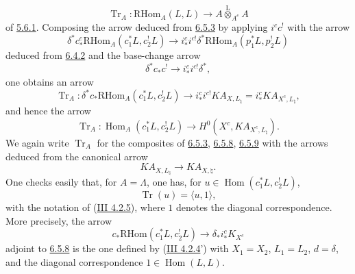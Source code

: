 \documentclass[11pt]{article}
\DeclareMathOperator{\Hom}{Hom}
\providecommand{\RHom}{\mathrm{RHom}}
\providecommand{\Tr}{\operatorname{Tr}}
\providecommand{\Tr}{\operatorname{Tr}}
\providecommand{\lten}{\overset{\mathrm L}{\otimes}}
\providecommand{\Tr}{\operatorname{Tr}}
\providecommand{\RHom}{\mathrm{RHom}}
\providecommand{\Hom}{\operatorname{Hom}}
\providecommand{\lten}{\overset{\mathrm L}{\otimes}}
\providecommand{\RHom}{\mathrm R\mathcal{H}om}
\providecommand{\lten}{\overset{\mathrm L}{\otimes}}
\providecommand{\Tr}{\operatorname{Tr}}
\providecommand{\lten}{\overset{\mathrm L}{\otimes}}
\providecommand{\lten}{\overset{\mathrm L}{\otimes}}
\providecommand{\lten}{\overset{\mathrm L}{\otimes}}
\providecommand{\RHom}{\mathrm{RHom}}
\providecommand{\Hom}{\operatorname{Hom}}
\providecommand{\Tr}{\operatorname{Tr}}
\providecommand{\lten}{\overset{\mathrm L}{\otimes}}
\begin{document}
\[
\Tr_A:\RHom_A(L,L)\longrightarrow A\lten_{A^e}A
\]
of \hyperref[sga5:IIIB:equation:5.6.1]{5.6.1}. Composing the arrow deduced from \hyperref[sga5:IIIB:equation:6.5.3]{6.5.3} by applying $i^cc^!$ with the arrow
\begin{equation}
\delta^*c_*^c\RHom_A(c_1^*L,c_2^!L)
\longrightarrow
i_*^ci^{c!}\delta^*\RHom_A(p_1^*L,p_2^!L)
\tag{6.5.7}\label{sga5:IIIB:equation:6.5.7}
\end{equation}
deduced from \hyperref[sga5:IIIB:equation:6.4.2]{6.4.2} and the base-change arrow
\[
\delta^*c_*c^!\longrightarrow i_*^ci^{c!}\delta^*,
\]
one obtains an arrow
\begin{equation}
\Tr_A:\delta^*c_*\RHom_A(c_1^*L,c_2^!L)
\longrightarrow
i_*^ci^{c!}KA_{X,L_{\natural}}
=i_*^cKA_{X^c,L_{\natural}},
\tag{6.5.8}\label{sga5:IIIB:equation:6.5.8}
\end{equation}
and hence the arrow
\begin{equation}
\Tr_A:\Hom_A(c_1^*L,c_2^!L)
\longrightarrow
H^0(X^c,KA_{X^c,L_{\natural}}).
\tag{6.5.9}\label{sga5:IIIB:equation:6.5.9}
\end{equation}
We again write $\Tr_A$ for the composites of \hyperref[sga5:IIIB:equation:6.5.3]{6.5.3}, \hyperref[sga5:IIIB:equation:6.5.8]{6.5.8}, \hyperref[sga5:IIIB:equation:6.5.9]{6.5.9} with the arrows deduced from the canonical arrow
\[
KA_{X,L_{\natural}}\longrightarrow KA_{X,\natural}.
\]
One checks easily that, for $A=\Lambda$, one has, for $u\in\Hom(c_1^*L,c_2^!L)$,
\begin{equation}
\Tr(u)=\langle u,1\rangle,
\tag{6.5.10}\label{sga5:IIIB:equation:6.5.10}
\end{equation}
with the notation of (\hyperref[sga5:III:equation:4.2.5]{III 4.2.5}), where $1$ denotes the diagonal correspondence. More precisely, the arrow
\[
c_*\RHom(c_1^*L,c_2^!L)\longrightarrow \delta_*i_*^cK_{X^c}
\]
adjoint to \hyperref[sga5:IIIB:equation:6.5.8]{6.5.8} is the one defined by (\hyperref[sga5:III:equation:4.2.4]{III 4.2.4}') with $X_1=X_2$, $L_1=L_2$, $d=\delta$, and the diagonal correspondence $1\in\Hom(L,L)$.
\end{document}
